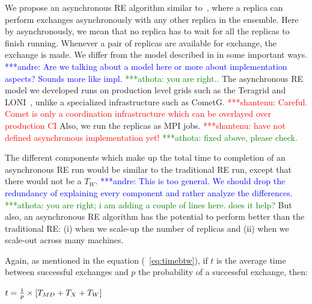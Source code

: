 \documentclass{rspublic}
\newcommand{\jhanote}[1]{ {\textcolor{red} { ***shantenu: #1 }}}
\newcommand{\alnote}[1]{ {\textcolor{blue} { ***andre: #1 }}}
\newcommand{\athotanote}[1]{ {\textcolor{green} { ***athota: #1 }}}
\newcommand{\alnote}[1]{}
\newcommand{\athotanote}[1]{}
\newcommand{\jhanote}[1]{}
\begin{document}
We propose an asynchronous RE algorithm similar
to~\citep{parashar_arepex}, where a replica can perform exchanges
asynchronously with any other replica in the ensemble. Here by asynchronously, we mean that no replica has to wait for all the replicas to finish running. Whenever a pair of replicas are available for exchange, the exchange is made. %
We differ from the model described in \citep{parashar_arepex}
in some important ways. \alnote{Are we talking about a model here or 
more about implementation aspects? Sounds more like impl.}\athotanote{you are right..}
The asynchronous RE model we developed runs on
production level grids such as the Teragrid and LONI~\citep{LONI_web},
unlike a specialized infrastructure such as CometG.
\jhanote{Careful. Comet is only a coordination infrastructure which
  can be overlayed over production CI} Also, we run the replicas as
MPI jobs. \jhanote{have not defined asynchronous implementation yet!} \athotanote{fixed above, please check.}


The different components which make up the total time to completion of 
an asynchronous RE run would be similar to the traditional RE run, 
except that there would not be a $T_W$. \alnote{This is too general. 
We should drop the redundancy of explaining every component and rather 
analyze the differences.} \athotanote{you are right; i am adding a couple of lines here. does it help?}But also, an asynchronous RE algorithm has the potential to perform better than the traditional RE: (i) when we scale-up the number of replicas and (ii) when we scale-out across many machines.

Again, as mentioned in the equation (~\ref{eq:timebtw}), if $t$ is the average time between successful exchanges and $p$ the probability of a successful exchange, then:

$t =  {1 \over p} \times {[T_{MD} + T_{X} + T_{W}]}$
\end{document}
